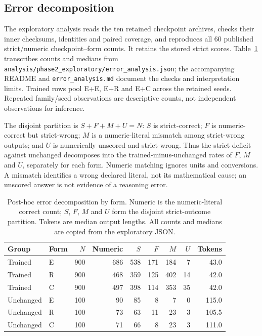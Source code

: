 \subsection{Error decomposition}
The exploratory analysis reads the ten retained checkpoint archives, checks their inner checksums, identities and paired coverage, and reproduces all 60 published strict/numeric checkpoint--form counts. It retains the stored strict scores. Table~\ref{tab:phase2-error-decomposition} transcribes counts and medians from \nolinkurl{analysis/phase2_exploratory/error_analysis.json}; the accompanying README and \nolinkurl{error_analysis.md} document the checks and interpretation limits. Trained rows pool E+E, E+R and E+C across the retained seeds. Repeated family/seed observations are descriptive counts, not independent observations for inference.

The disjoint partition is $S+F+M+U=N$: $S$ is strict-correct; $F$ is numeric-correct but strict-wrong; $M$ is a numeric-literal mismatch among strict-wrong outputs; and $U$ is numerically unscored and strict-wrong. Thus the strict deficit against unchanged decomposes into the trained-minus-unchanged rates of $F$, $M$ and $U$, separately for each form. Numeric matching ignores units and conversions. A mismatch identifies a wrong declared literal, not its mathematical cause; an unscored answer is not evidence of a reasoning error.

\begin{table}[H]
\centering\footnotesize\singlespacing
\caption{Post-hoc error decomposition by form. Numeric is the numeric-literal correct count; $S$, $F$, $M$ and $U$ form the disjoint strict-outcome partition. Tokens are median output lengths. All counts and medians are copied from the exploratory JSON.}
\label{tab:phase2-error-decomposition}
\begin{tabular}{@{}llrrrrrrr@{}}
\toprule
Group & Form & $N$ & Numeric & $S$ & $F$ & $M$ & $U$ & Tokens\\
\midrule
Trained & E & 900 & 686 & 538 & 171 & 184 & 7 & 43.0\\
Trained & R & 900 & 468 & 359 & 125 & 402 & 14 & 42.0\\
Trained & C & 900 & 497 & 398 & 114 & 353 & 35 & 42.0\\
Unchanged & E & 100 & 90 & 85 & 8 & 7 & 0 & 115.0\\
Unchanged & R & 100 & 73 & 63 & 11 & 23 & 3 & 105.5\\
Unchanged & C & 100 & 71 & 66 & 8 & 23 & 3 & 111.0\\
\bottomrule
\end{tabular}
\end{table}

